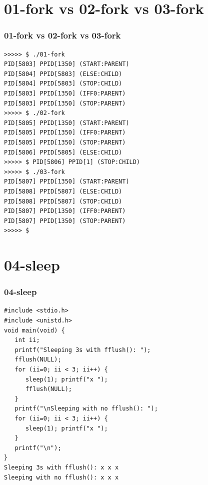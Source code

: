 \documentclass[aspectratio=169, xcolor=table, notheorems, hyperref={pdfpagelabels=false}]{beamer}
\begin{document}
\section{01-fork vs 02-fork vs 03-fork}
\begin{frame}[fragile]
\frametitle{01-fork vs 02-fork vs 03-fork}
\begin{lstlisting}[basicstyle=\ttfamily\footnotesize]
>>>>> $ ./01-fork 
PID[5803] PPID[1350] (START:PARENT)
PID[5804] PPID[5803] (ELSE:CHILD)
PID[5804] PPID[5803] (STOP:CHILD)
PID[5803] PPID[1350] (IFF0:PARENT)
PID[5803] PPID[1350] (STOP:PARENT)
>>>>> $ ./02-fork 
PID[5805] PPID[1350] (START:PARENT)
PID[5805] PPID[1350] (IFF0:PARENT)
PID[5805] PPID[1350] (STOP:PARENT)
PID[5806] PPID[5805] (ELSE:CHILD)
>>>>> $ PID[5806] PPID[1] (STOP:CHILD)
>>>>> $ ./03-fork 
PID[5807] PPID[1350] (START:PARENT)
PID[5808] PPID[5807] (ELSE:CHILD)
PID[5808] PPID[5807] (STOP:CHILD)
PID[5807] PPID[1350] (IFF0:PARENT)
PID[5807] PPID[1350] (STOP:PARENT)
>>>>> $ 
\end{lstlisting}
\end{frame}

\section{04-sleep}
\begin{frame}[fragile]
\frametitle{04-sleep}
\begin{lstlisting}[basicstyle=\ttfamily\footnotesize]
#include <stdio.h>
#include <unistd.h>
void main(void) {
   int ii;
   printf("Sleeping 3s with fflush(): ");
   fflush(NULL);
   for (ii=0; ii < 3; ii++) {
      sleep(1); printf("x ");
      fflush(NULL);
   }
   printf("\nSleeping with no fflush(): ");
   for (ii=0; ii < 3; ii++) {
      sleep(1); printf("x ");
   }
   printf("\n");
}
Sleeping 3s with fflush(): x x x 
Sleeping with no fflush(): x x x 
\end{lstlisting}
\end{frame}
\end{document}
